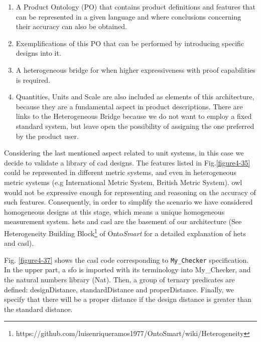 \begin{enumerate}

\item A Product Ontology (PO) that contains product definitions and features that can be represented in a given language and where conclusions concerning their accuracy can also be obtained.  

\item Exemplifications of this PO that can be performed by introducing specific designs into it.  

\item A heterogeneous bridge for when higher expressiveness with proof capabilities is required.  

\item Quantities, Units and Scale are also included as elements of this architecture, because they are a fundamental aspect in product descriptions. There are links to the Heterogeneous Bridge because we do not want to employ a fixed standard system, but leave open the possibility of assigning the one preferred by the product user.  

\end{enumerate}



Considering the last mentioned aspect related to unit systems, in this case we decide to validate a library of \gls{cad} designs. The features listed in Fig.\ref{figure4-35} could be represented in different metric systems, and even in heterogeneous metric systems (e.g International Metric System, British Metric System). \gls{owl} would not be expressive enough for representing and reasoning on the accuracy of such features. Consequently, in order to simplify the scenario we have considered homogeneous designs at this stage, which means a unique homogeneous measurement system. \gls{hets} and \gls{casl} are the basement of our architecture (See Heterogeneity Building Block\footnote{https://github.com/luisenriqueramos1977/OntoSmart/wiki/Heterogeneity} of Onto\textit{Smart} for a detailed explanation of \gls{hets} and \gls{casl}).

Fig. \ref{figure4-37} shows the \gls{casl} code corresponding to \texttt{My\_Checker} specification. In the upper part, a \gls{sfo} is imported with its terminology into My\_Checker, and    the natural numbers library (Nat). Then, a group of ternary predicates are defined: designDistance, standardDistance and properDistance. Finally, we specify that there will be a proper distance if the design distance is greater than the standard distance.

